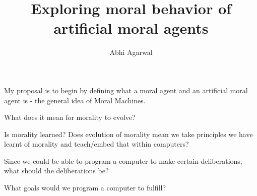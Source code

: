 \documentclass[11pt, oneside]{article}
\title{Exploring moral behavior of artificial moral agents}
\author{Abhi Agarwal}
\date{}
\begin{document}
\maketitle

\par My proposal is to begin by defining what a moral agent and an artificial moral agent is - the general idea of Moral Machines.
\par What does it mean for morality to evolve?
\par Is morality learned? Does evolution of morality mean we take principles we have learnt of morality and teach/embed that within computers?
\par Since we could be able to program a computer to make certain deliberations, what should the deliberations be?
\par What goals would we program a computer to fulfill?
\end{document}
